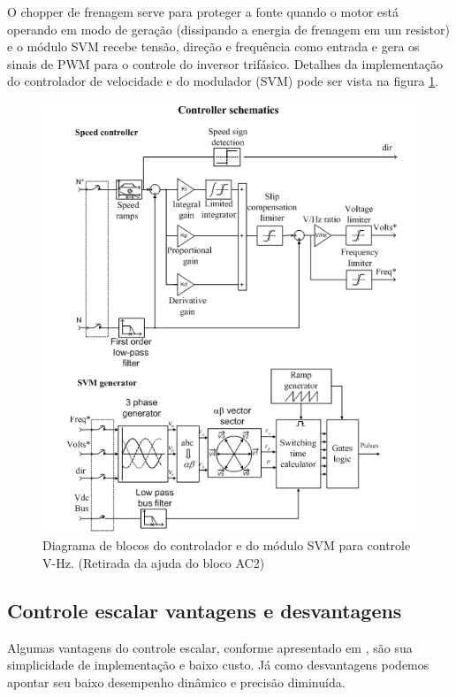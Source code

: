 \documentclass{article}
\begin{document}
O chopper de frenagem serve para proteger a fonte quando o motor está operando em modo de geração (dissipando a energia de frenagem em um resistor) e o módulo SVM recebe tensão, direção e frequência como entrada e gera os sinais de PWM para o controle do inversor trifásico.
Detalhes da implementação do controlador de velocidade e do modulador (SVM) pode ser vista na figura \ref{fig:esqC}.
\begin{figure}[H]
	\centering
	\includegraphics[width=\linewidth]{esqC}
	\caption{Diagrama de blocos do controlador e do módulo SVM para controle V-Hz. (Retirada da ajuda do bloco AC2)}
	\label{fig:esqC}
\end{figure}

\subsection{Controle escalar vantagens e desvantagens}
Algumas vantagens do controle escalar, conforme apresentado em \cite{bb:fodor}, são sua simplicidade de implementação e baixo custo. Já como desvantagens podemos apontar seu baixo desempenho dinâmico e precisão diminuída.
\end{document}
